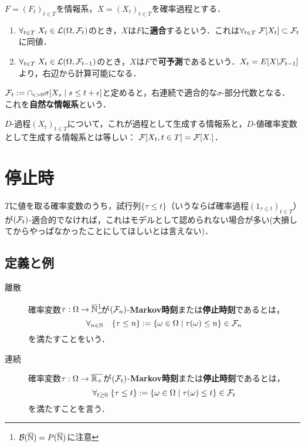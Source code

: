 \documentclass[uplatex,dvipdfmx]{jsreport}
\begin{document}
\begin{definition}
    $F=(F_t)_{t\in T}$を情報系，$X=(X_t)_{t\in T}$を確率過程とする．
    \begin{enumerate}
        \item $\forall_{t\in T}\;X_t\in\mathcal{L}(\Omega,\mathcal{F}_t)$のとき，$X$は$F$に\textbf{適合}するという．これは$\forall_{t\in T}\;\mathcal{F}[X_t]\subset\mathcal{F}_t$に同値．
        \item $\forall_{t\in T}\;X_t\in\mathcal{L}(\Omega,\mathcal{F}_{t-1})$のとき，$X$は$F$で\textbf{可予測}であるという．$X_t=E[X|\mathcal{F}_{t-1}]$より，右辺から計算可能になる．
    \end{enumerate}
\end{definition}

\begin{example}
    $\mathcal{F}_t:=\cap_{\epsilon>0}\sigma[X_s\mid s\le t+\epsilon]$と定めると，右連続で適合的な$\sigma$-部分代数となる．
    これを\textbf{自然な情報系}という．
\end{example}

\begin{proposition}
    $D$-過程$(X_t)_{t\in T}$について，これが過程として生成する情報系と，$D$-値確率変数として生成する情報系とは等しい：
    $\mathcal{F}[X_t,t\in T]=\mathcal{F}[X.]$．
\end{proposition}

\section{停止時}

\begin{tcolorbox}[colframe=ForestGreen, colback=ForestGreen!10!white,breakable,colbacktitle=ForestGreen!40!white,coltitle=black,fonttitle=\bfseries\sffamily,
title=過程のランダムな裁断を停止過程という]
    $T$に値を取る確率変数のうち，試行列$\{\tau\le t\}$（いうならば確率過程$(1_{\tau\le t})_{t\in T}$）が$(\mathcal{F}_t)$-適合的でなければ，これはモデルとして認められない場合が多い(大損してからやっぱなかったことにしてほしいとは言えない)．
\end{tcolorbox}

\subsection{定義と例}

\begin{definition}\mbox{}
    \begin{description}
        \item[離散] 確率変数$\tau:\Omega\to\overline{\mathbb{N}}$\footnote{$\mathcal{B}(\overline{\mathbb{N}})=P(\overline{\mathbb{N}})$に注意}が$(\mathcal{F}_n)$-\textbf{Markov時刻}または\textbf{停止時刻}であるとは，
        \[\forall_{n\in\mathbb{N}}\quad\{\tau\le n\}:=\left\{\omega\in\Omega\mid\tau(\omega)\le n\right\}\in\mathcal{F}_n\]
        を満たすことをいう．
        \item[連続] 確率変数$\tau:\Omega\to\overline{\mathbb{R}_+}$が$(\mathcal{F}_t)$-\textbf{Markov時刻}または\textbf{停止時刻}であるとは，
        \[\forall_{t\ge0}\;\{\tau\le t\}:=\left\{\omega\in\Omega\mid\tau(\omega)\le t\right\}\in\mathcal{F}_t\]
        を満たすことを言う．
    \end{description}
\end{definition}
\end{document}
